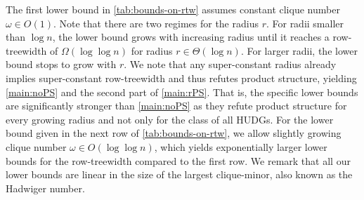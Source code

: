 \documentclass[a4paper,english,cleveref,thm-restate]{lipics-v2021}
\begin{document}
The first lower bound in \cref{tab:bounds-on-rtw} assumes constant clique number $\omega \in O(1)$.
Note that there are two regimes for the radius $r$.
For radii smaller than $\log n$, the lower bound grows with increasing radius until it reaches a row-treewidth of $\Omega(\log\log n)$ for radius $r \in \Theta(\log n)$.
For larger radii, the lower bound stops to grow with $ r $.
We note that any super-constant radius already implies super-constant row-treewidth and thus refutes product structure, yielding \cref{main:noPS} and the second part of \cref{main:rPS}.
That is, the specific lower bounds are significantly stronger than \cref{main:noPS} as they refute product structure for every growing radius and not only for the class of all HUDGs.
%
For the lower bound given in the next row of \cref{tab:bounds-on-rtw}, we allow slightly growing clique number $\omega \in O(\log \log n)$, which yields exponentially larger lower bounds for the row-treewidth compared to the first row.
We remark that all our lower bounds are linear in the size of the largest clique-minor, also known as the Hadwiger number.
\end{document}
